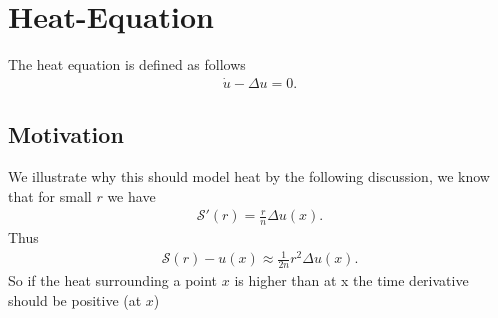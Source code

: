 \chapter{Heat-Equation}
\begin{Definition}
 The heat equation is defined as follows 
 \begin{align*}
  \dot{u}  - \Delta  u = 0
 .\end{align*}
\end{Definition}
\section{Motivation}
We illustrate why this should model heat by the following discussion, we know that for small $r$  we have
\begin{align*}
  \mathcal{S}'(r) = \frac{r}{n} \Delta u(x)
.\end{align*}
Thus 
\begin{align*}
  \mathcal{S}(r) - u(x) \approx \frac{1}{2n} r^2 \Delta u(x)
.\end{align*}
So if the heat surrounding a point $x$ is higher than at x the time derivative should be positive (at $x$)
